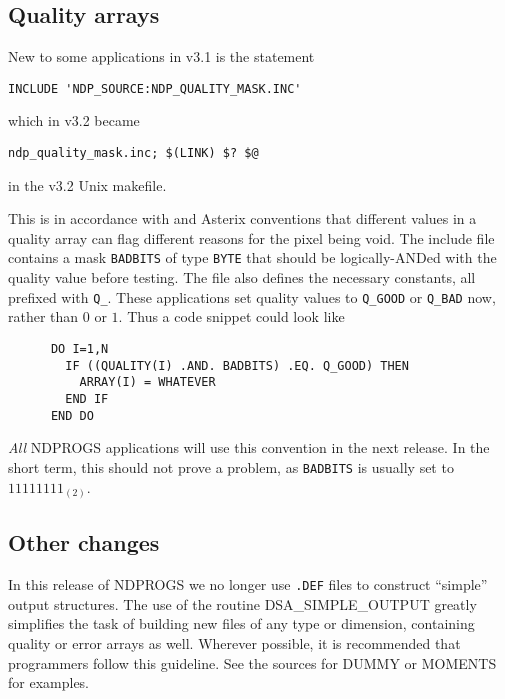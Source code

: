 \subsection{Quality arrays}

New to some applications in v3.1 is the statement

\begin{myquote}
\begin{verbatim}
INCLUDE 'NDP_SOURCE:NDP_QUALITY_MASK.INC'
\end{verbatim}
\end{myquote}

which in v3.2 became

\begin{myquote}
\begin{verbatim}
ndp_quality_mask.inc; $(LINK) $? $@
\end{verbatim}
\end{myquote}

in the v3.2 Unix makefile.

This is in accordance with  and Asterix conventions that different values
in a quality array can flag different reasons for the pixel being void. The
include file contains a mask {\tt BADBITS} of type {\tt BYTE} that should be
logically-ANDed with the quality value before testing. The file also defines
the necessary constants, all prefixed with {\tt Q\_}. These applications set
quality values to {\tt Q\_GOOD} or {\tt Q\_BAD} now, rather than $0$ or $1$.
Thus a code snippet could look like

\begin{myquote}
\begin{verbatim}
      DO I=1,N
        IF ((QUALITY(I) .AND. BADBITS) .EQ. Q_GOOD) THEN
          ARRAY(I) = WHATEVER
        END IF
      END DO
\end{verbatim}
\end{myquote}

{\em All} NDPROGS applications will use this convention in the next release.
In the short term, this should not prove a problem, as {\tt BADBITS} is
usually set to $11111111_{(2)}$.

\subsection{Other changes}

In this release of NDPROGS we no longer use {\tt .DEF} files to
construct ``simple'' output structures. The use of the routine
DSA\_SIMPLE\_OUTPUT greatly simplifies the task of building new files of any
type or dimension, containing quality or error arrays as well. Wherever
possible, it is recommended that programmers follow this guideline. See the
sources for DUMMY or MOMENTS for examples.


